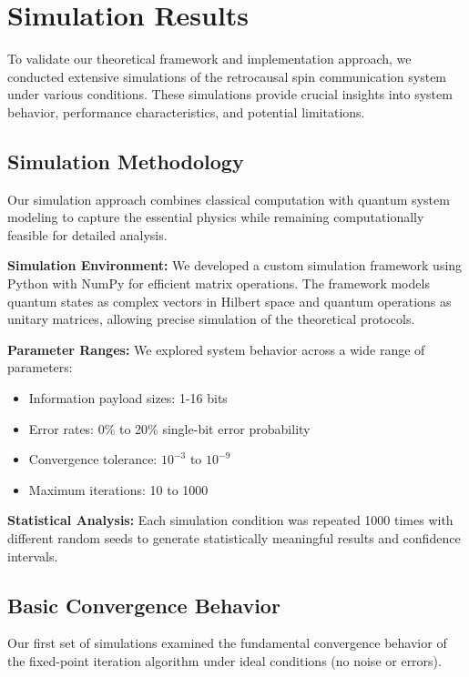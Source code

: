 \documentclass[12pt,a4paper]{article}
\begin{document}
\section{Simulation Results}

To validate our theoretical framework and implementation approach, we conducted extensive simulations of the retrocausal spin communication system under various conditions. These simulations provide crucial insights into system behavior, performance characteristics, and potential limitations.

\subsection{Simulation Methodology}

Our simulation approach combines classical computation with quantum system modeling to capture the essential physics while remaining computationally feasible for detailed analysis.

\textbf{Simulation Environment:} We developed a custom simulation framework using Python with NumPy for efficient matrix operations. The framework models quantum states as complex vectors in Hilbert space and quantum operations as unitary matrices, allowing precise simulation of the theoretical protocols.

\textbf{Parameter Ranges:} We explored system behavior across a wide range of parameters:
\begin{itemize}
\item Information payload sizes: 1-16 bits
\item Error rates: 0\% to 20\% single-bit error probability
\item Convergence tolerance: $10^{-3}$ to $10^{-9}$
\item Maximum iterations: 10 to 1000
\end{itemize}

\textbf{Statistical Analysis:} Each simulation condition was repeated 1000 times with different random seeds to generate statistically meaningful results and confidence intervals.

\subsection{Basic Convergence Behavior}

Our first set of simulations examined the fundamental convergence behavior of the fixed-point iteration algorithm under ideal conditions (no noise or errors).
\end{document}
